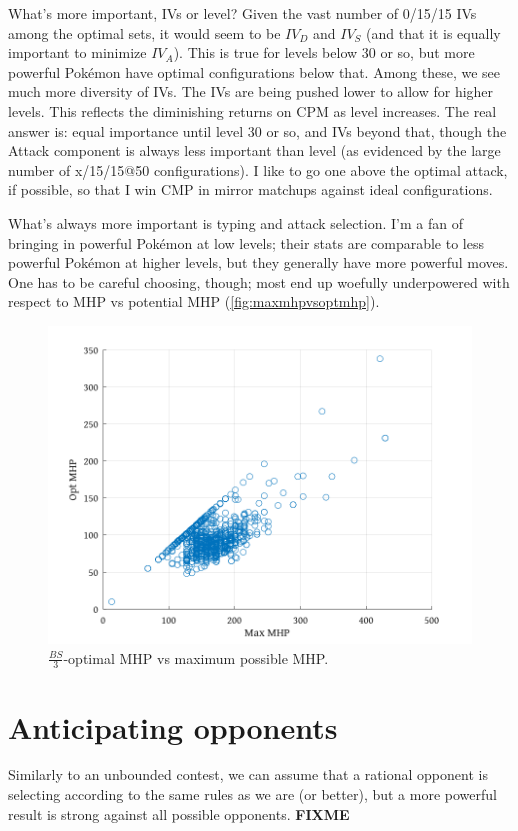 What's more important, IVs or level?
Given the vast number of 0/15/15 IVs among the optimal sets, it
  would seem to be $IV_D$ and $IV_S$ (and that it is equally
  important to minimize $IV_A$).
This is true for levels below 30 or so, but more powerful Pokémon
  have optimal configurations below that.
Among these, we see much more diversity of IVs.
The IVs are being pushed lower to allow for higher levels.
This reflects the diminishing returns on CPM as level increases.
The real answer is: equal importance until level 30 or so, and IVs beyond that,
  though the Attack component is always less important than level
  (as evidenced by the large number of x/15/15@50 configurations).
I like to go one above the optimal attack, if possible, so that I
  win CMP in mirror matchups against ideal configurations.

What's always more important is typing and attack selection.
I'm a fan of bringing in powerful Pokémon at low levels; their stats are
  comparable to less powerful Pokémon at higher levels, but they
  generally have more powerful moves.
One has to be careful choosing, though; most end up woefully underpowered
  with respect to MHP vs potential MHP (\autoref{fig:maxmhpvsoptmhp}).
\begin{figure}
\includegraphics[width=\textwidth]{octave/maxmhpvsoptmhp.png}
  \caption{$\frac{BS}{3}$-optimal MHP vs maximum possible MHP.\label{fig:maxmhpvsoptmhp}}
\end{figure}

\section{Anticipating opponents}
Similarly to an unbounded contest, we can assume that a rational opponent is selecting
  according to the same rules as we are (or better), but a more powerful result is
  strong against all possible opponents.
\textbf{FIXME}

